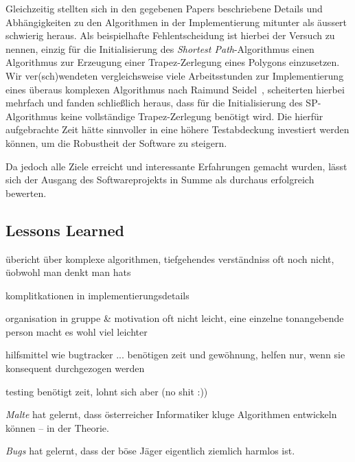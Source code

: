   Gleichzeitig stellten sich in den gegebenen Papers beschriebene Details und
  Abhängigkeiten zu den Algorithmen in der Implementierung mitunter als äussert
  schwierig heraus. Als beispielhafte Fehlentscheidung ist hierbei der Versuch
  zu nennen, einzig für die Initialisierung des \emph{Shortest Path}-Algorithmus
  einen Algorithmus zur Erzeugung einer Trapez-Zerlegung eines Polygons einzusetzen.
  Wir ver(sch)wendeten vergleichsweise viele Arbeitsstunden zur
  Implementierung eines überaus komplexen Algorithmus nach Raimund
  Seidel~\cite{seidel91asimple}, scheiterten hierbei mehrfach und fanden
  schließlich heraus, dass für die Initialisierung des SP-Algorithmus keine
  vollständige Trapez-Zerlegung benötigt wird. Die hierfür aufgebrachte Zeit hätte
  sinnvoller in eine höhere Testabdeckung investiert werden können, um die
  Robustheit der Software zu steigern.

  Da jedoch alle Ziele erreicht und interessante Erfahrungen gemacht wurden, lässt
  sich der Ausgang des Softwareprojekts in Summe als durchaus erfolgreich bewerten.

  \subsection{Lessons Learned}

  übericht über komplexe algorithmen, tiefgehendes verständniss oft noch nicht,
  üobwohl man denkt man hats

  komplitkationen in implementierungsdetails

  organisation in gruppe \& motivation oft nicht leicht, eine einzelne
  tonangebende person macht es wohl viel leichter

  hilfsmittel wie bugtracker ... benötigen zeit und gewöhnung, helfen nur, wenn
  sie konsequent durchgezogen werden
  
  testing benötigt zeit, lohnt sich aber (no shit :))

  \begin{lessonlearned}
    \emph{Malte} hat gelernt, dass österreicher Informatiker kluge 
    Algorithmen entwickeln können -- in der Theorie.
  \end{lessonlearned}

  \begin{lessonlearned}
    \emph{Bugs} hat gelernt, dass der böse Jäger eigentlich 
    ziemlich harmlos ist.
  \end{lessonlearned}
